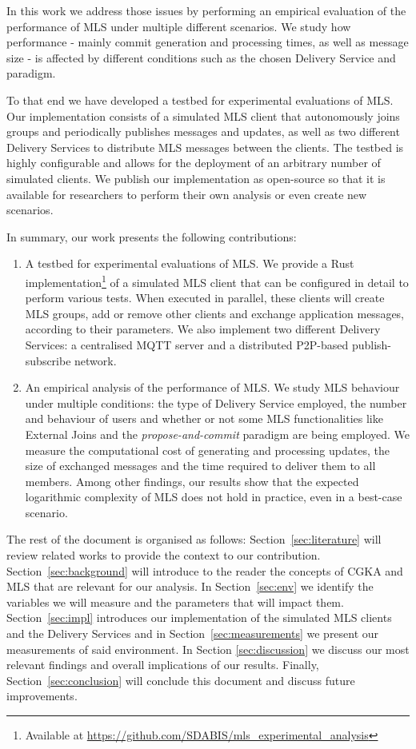 \documentclass[preprint, 12pt]{elsarticle}
\begin{document}
In this work we address those issues by performing an empirical evaluation of the performance of MLS under multiple different scenarios. We study how performance - mainly commit generation and processing times, as well as message size - is affected by different conditions such as the chosen Delivery Service and paradigm.

To that end we have developed a testbed for experimental evaluations of MLS. Our implementation consists of a simulated MLS client that autonomously joins groups and periodically publishes messages and updates, as well as two different Delivery Services to distribute MLS messages between the clients. The testbed is highly configurable and allows for the deployment of an arbitrary number of simulated clients. We publish our implementation as open-source so that it is available for researchers to perform their own analysis or even create new scenarios.

In summary, our work presents the following contributions:
\begin{enumerate}
    \item A testbed for experimental evaluations of MLS. We provide a Rust implementation\footnote{Available at \url{https://github.com/SDABIS/mls_experimental_analysis}} of a simulated MLS client that can be configured in detail to perform various tests. When executed in parallel, these clients will create MLS groups, add or remove other clients and exchange application messages, according to their parameters. We also implement two different Delivery Services: a centralised MQTT server and a distributed P2P-based publish-subscribe network.
    \item An empirical analysis of the performance of MLS. We study MLS behaviour under multiple conditions: the type of Delivery Service employed, the number and behaviour of users and whether or not some MLS functionalities like External Joins and the \textit{propose-and-commit} paradigm are being employed. We measure the computational cost of generating and processing updates, the size of exchanged messages and the time required to deliver them to all members. Among other findings, our results show that the expected logarithmic complexity of MLS does not hold in practice, even in a best-case scenario.
\end{enumerate}

The rest of the document is organised as follows: Section~\ref{sec:literature} will review related works to provide the context to our contribution. Section~\ref{sec:background} will introduce to the reader the concepts of CGKA and MLS that are relevant for our analysis. In Section~\ref{sec:env} we identify the variables we will measure and the parameters that will impact them. Section~\ref{sec:impl} introduces our implementation of the simulated MLS clients and the Delivery Services and in Section~\ref{sec:measurements} we present our measurements of said environment. In Section \ref{sec:discussion} we discuss our most relevant findings and overall implications of our results. Finally, Section~\ref{sec:conclusion} will conclude this document and discuss future improvements.
\end{document}
